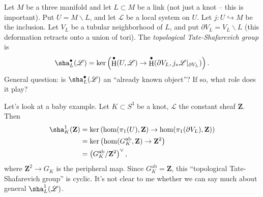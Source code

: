 \documentclass{article}
\DeclareMathOperator{\h}{H}
\newcommand{\dZ}{\mathbf{Z}}
\newcommand{\sL}{\mathscr{L}}
\newcommand{\abelian}{\mathrm{ab}}
\begin{document}
Let $M$ be a three manifold and let $L\subset M$ be a link (not just a knot -- 
this is important). Put $U=M\smallsetminus L$, and let $\sL$ be a local system 
on $U$. Let $j:U\hookrightarrow M$ be the inclusion. Let $V_L$ be a tubular 
neighborhood of $L$, and put $\partial V_L=V_L\smallsetminus L$ (this 
deformation retracts onto a union of tori). The \emph{topological 
Tate-Shafarevich group} is 
\[
  \sha_L^\bullet(\sL) = \ker\left(\h^\bullet(U,\sL) \to \h^\bullet(\partial V_L,j_\ast \sL|_{\partial V_L})\right) .
\]
General question: is $\sha_L^\bullet(\sL)$ an ``already known object''? If so, 
what role does it play?

Let's look at a baby example. Let $K\subset S^3$ be a knot, $\sL$ the constant 
sheaf $\dZ$. Then 
\begin{align*}
  \sha_K^1(\dZ) 
    &= \ker\left(\hom(\pi_1(U),\dZ) \to \hom(\pi_1(\partial V_L),\dZ)\right) \\
    &= \ker\left(\hom(G_K^\abelian,\dZ) \to \dZ^2\right) \\
    &= \left(G_K^\abelian / \dZ^2\right)^\vee ,
\end{align*}
where $\dZ^2\to G_K$ is the peripheral map. Since $G_K^\abelian=\dZ$, this 
``topological Tate-Shafarevich group'' is cyclic. It's not clear to me whether 
we can say much about general $\sha_L^1(\sL)$. 
\end{document}

